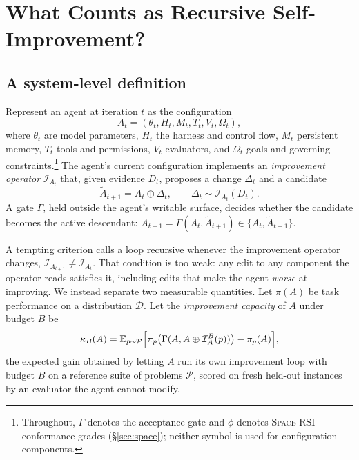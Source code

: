 \documentclass[11pt,a4paper]{article}
\newcommand{\SpaceRSI}{\textsc{Space-RSI}}
\begin{document}
\section{What Counts as Recursive Self-Improvement?}\label{sec:whatcounts}

\subsection{A system-level definition}\label{sec:def}

Represent an agent at iteration $t$ as the configuration
\begin{equation}\label{eq:config}
A_t = (\theta_t, H_t, M_t, T_t, V_t, \Omega_t),
\end{equation}
where $\theta_t$ are model parameters, $H_t$ the harness and control flow, $M_t$ persistent memory, $T_t$ tools and permissions, $V_t$ evaluators, and $\Omega_t$ goals and governing constraints.\footnote{Throughout, $\Gamma$ denotes the acceptance gate and $\phi$ denotes \SpaceRSI{} conformance grades (\S\ref{sec:space}); neither symbol is used for configuration components.} The agent's current configuration implements an \emph{improvement operator} $\mathcal{I}_{A_t}$ that, given evidence $D_t$, proposes a change $\Delta_t$ and a candidate
\begin{equation}\label{eq:candidate}
\tilde{A}_{t+1} = A_t \oplus \Delta_t, \qquad \Delta_t \sim \mathcal{I}_{A_t}(D_t).
\end{equation}
A gate $\Gamma$, held outside the agent's writable surface, decides whether the candidate becomes the active descendant: $A_{t+1} = \Gamma(A_t, \tilde{A}_{t+1}) \in \{A_t, \tilde{A}_{t+1}\}$.

A tempting criterion calls a loop recursive whenever the improvement operator changes, $\mathcal{I}_{A_{t+1}} \neq \mathcal{I}_{A_t}$. That condition is too weak: any edit to any component the operator reads satisfies it, including edits that make the agent \emph{worse} at improving. We instead separate two measurable quantities. Let $\pi(A)$ be task performance on a distribution $\mathcal{D}$. Let the \emph{improvement capacity} of $A$ under budget $B$ be
\begin{equation}\label{eq:kappa}
\kappa_B(A) = \mathbb{E}_{p\sim\mathcal{P}}\Bigl[\pi_p\bigl(\Gamma(A, A \oplus \mathcal{I}^{B}_{A}(p))\bigr) - \pi_p(A)\Bigr],
\end{equation}
the expected gain obtained by letting $A$ run its own improvement loop with budget $B$ on a reference suite of problems $\mathcal{P}$, scored on fresh held-out instances by an evaluator the agent cannot modify.
\end{document}
